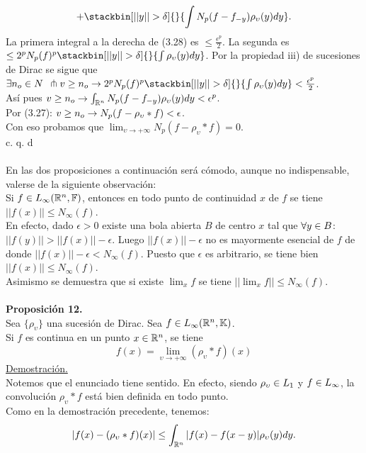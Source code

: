 $$
+ \stackbin[||y|| > \delta]{}{\int N_p (f-f_{-y})\rho_\upsilon (y)dy}.
$$
La primera integral a la derecha de (3.28) es $\leq \frac{\epsilon^p}{2}$. La segunda es $ \leq 2^p N_p (f)^p \stackbin[||y|| > \delta]{}{\int \rho_\upsilon (y)dy}$. Por la propiedad iii) de sucesiones de Dirac se sigue que $\exists n_o \en N \phantom{s} \pitchfork v \geq n_o \flecha 2^p N_p (f)^p \stackbin[||y|| > \delta]{}{\int \rho_\upsilon (y)dy} <\frac{\epsilon^p}{2}$. \\
Así pues $v \geq n_o \rightarrow \int_{\mathbb{R}^n} N_p (f-f_{-y})\rho_\upsilon (y)dy<\epsilon^p$.\\
Por (3.27): $v \geq n_o \rightarrow N_p (f-\rho_\upsilon * f)<\epsilon$.\\
Con eso probamos que $\lim_{\upsilon \to +\infty}
N_p (f-\rho_\upsilon *f)=0$. \\
 \phantom{sssssssssssssssssssssssssssssssssss sasdasdasdasdadadssada} c. q. d \\ \\
En las dos proposiciones a continuación será cómodo, aunque no indispensable, valerse de la siguiente observación: \\
Si $f \in L_\infty (\mathbb{R}^n, \mathbb{F})$, entonces en todo punto de continuidad $x$ de $f$ se tiene $||f(x)|| \leq N_\infty (f)$. \\
En efecto, dado $\epsilon>0$ existe una bola abierta $B$ de centro $x$ tal que $\forall y \in B$: $||f(y)|| > ||f(x)|| -\epsilon$. Luego $||f(x)||- \epsilon$ no es mayormente esencial de $f$ de donde $||f(x)||- \epsilon<N_\infty (f)$. Puesto que $\epsilon$ es arbitrario, se tiene bien $||f(x)|| \leq N_\infty (f)$. \\
Asimismo se demuestra que si existe $\lim_x f$ se tiene $||\lim_x f || \leq N_\infty (f)$. \\ \\
\textbf{Proposición 12.} \\
Sea $\lbrace \rho_\upsilon \rbrace$ una sucesión de Dirac. Sea $f\in L_\infty (\mathbb{R}^n , \mathbb{K})$. \\
Si $f$ es continua en un punto $x \in \mathbb{R}^n$, se tiene
$$
f(x)=\lim_{\upsilon \to +\infty} (\rho_\upsilon *f)(x)
$$
\underline{Demostración.} \\
Notemos que el enunciado tiene sentido. En efecto, siendo $\rho_\upsilon \in L_1$ y $f \in L_\infty$, la convolución $\rho_\upsilon * f$ está bien definida en todo punto. \\
Como en la demostración precedente, tenemos: 
\begin{equation}
|f(x)-(\rho_\upsilon *f)(x)| \leq \int_{\mathbb{R}^n}|f(x)-f(x-y)|\rho_\upsilon (y)dy.
\end{equation}
